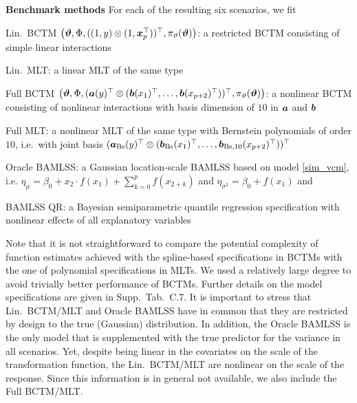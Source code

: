 \documentclass[12pt]{article}
\theoremstyle{plain}
\begin{document}
\noindent\textbf{Benchmark methods} For each of the resulting six scenarios, we fit 
\begin{compactitem}
\item Lin.~BCTM $\big( \text{\boldmath$\vartheta$}, \Phi,((1,y) \otimes (1,\text{\boldmath$x$}_p^\top))^\top,\allowbreak \pi_\vartheta(\text{\boldmath$\vartheta$})\big)$: a restricted BCTM consisting of simple linear interactions
\item Lin.~MLT: a linear MLT of the same type 
\item Full BCTM $\big(\text{\boldmath$\vartheta$},\Phi,(\text{\boldmath$a$}(y)^\top \otimes ( \text{\boldmath$b$}(x_1)^\top, \ldots,\allowbreak \text{\boldmath$b$}(x_{p+2})^\top))^\top, \pi_\vartheta(\text{\boldmath$\vartheta$})\big)$: a nonlinear BCTM consisting of nonlinear interactions
 with  basis dimension of $10$  in $\text{\boldmath$a$}$ and $\text{\boldmath$b$}$
\item Full MLT: a nonlinear MLT of the same type with Bernstein polynomials of order $10$, i.e.~with joint basis  $(\text{\boldmath$a$}_{\text{Bs}}(y)^\top \otimes ( \text{\boldmath$b$}_{\text{Bs}}(x_1)^\top, \ldots, \text{\boldmath$b$}_{\text{Bs},10}(x_{p+2})^\top))^\top$ 
\item Oracle BAMLSS: a Gaussian location-scale BAMLSS based on model \eqref{sim_vcm}, i.e. $\eta_{\mu} = \beta_0 + x_2 \cdot f(x_1) + \sum_{k=0}^p f(x_{2+k})$ and $\eta_{\sigma^2}= \beta_0 + f(x_1)$  and
\item BAMLSS QR: a Bayesian semiparametric quantile regression specification with nonlinear effects of all explanatory variables
\end{compactitem}
Note that it is not straightforward to compare the potential complexity of function estimates achieved with the spline-based specifications in BCTMs with the one of polynomial specifications in MLTs. We used a relatively large degree to avoid trivially better performance of BCTMs. Further details on the model specifications are given in Supp.~Tab.~C.7.
It is important to stress that  Lin.~BCTM/MLT and Oracle BAMLSS have in common that they are restricted by design to the true (Gaussian) distribution. In addition, the Oracle BAMLSS is the only model that is supplemented with the true predictor for the variance in all scenarios. Yet, despite being linear in the covariates on the scale of the transformation function, the Lin.~BCTM/MLT are nonlinear on the scale of the response. Since this information is in general not available, we also include the Full BCTM/MLT. %
\end{document}
